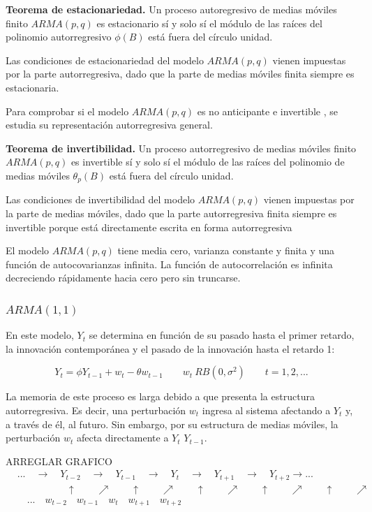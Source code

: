 \documentclass[a4paper,10pt]{article}
\begin{document}
\textbf{Teorema de estacionariedad.} Un proceso autoregresivo de medias móviles finito $ARMA(p,q)$ es estacionario sí y solo sí el módulo de las raíces del polinomio autorregresivo $\phi(B)$ está fuera del círculo unidad.

Las condiciones de estacionariedad del modelo $ARMA(p,q)$ vienen impuestas por la parte autorregresiva, dado que la parte de medias móviles finita siempre es estacionaria.

Para comprobar si el modelo $ARMA(p,q)$ es no anticipante e invertible , se estudia su representación autorregresiva general.

\textbf{Teorema de invertibilidad.} Un proceso autorregresivo de medias móviles finito $ARMA(p,q)$ es invertible sí y solo sí el módulo de las raíces del polinomio de medias móviles $\theta_p(B)$ está fuera del círculo unidad.

Las condiciones de invertibilidad del modelo $ARMA(p,q)$ vienen impuestas por la parte de medias móviles, dado que la parte autorregresiva finita siempre es invertible porque está directamente escrita en forma autorregresiva

El modelo $ARMA(p,q)$ tiene media cero, varianza constante y finita y una función de autocovarianzas infinita. La función de autocorrelación es infinita decreciendo rápidamente hacia cero pero sin truncarse.

\subsubsection{$ARMA(1,1)$}

En este modelo, $Y_t$ se determina en función de su pasado hasta el primer retardo, la innovación contemporánea y el pasado de la innovación hasta el retardo 1:

\begin{equation}
Y_t = \phi Y_{t-1} + w_t - \theta w_{t-1} \qquad w_t ~ RB (0,\sigma^2) \qquad t=1,2,...
\end{equation}


La memoria de este proceso es larga debido a que presenta la estructura autorregresiva. Es decir, una perturbación $w_t$ ingresa al sistema afectando a $Y_t$ y, a través de él, al futuro. Sin embargo, por su estructura de medias móviles, la perturbación $w_t$ afecta directamente a $Y_t$ $Y_{t-1}$.

ARREGLAR GRAFICO
\begin{equation*}
\begin{split}
& ... \quad \to \quad Y_{t-2} \quad \to \quad Y_{t-1} \quad \to \quad Y_{t} \quad \to \quad Y_{t+1} \quad \to \quad Y_{t+2} \to ... \\
& \quad \quad \quad \quad \quad \uparrow \quad \quad \nearrow \quad \quad \uparrow \quad \quad \nearrow \quad \quad \uparrow \quad \quad \nearrow \quad \quad \uparrow \quad \quad \nearrow \quad \quad \uparrow \quad \quad \nearrow \\
& \quad ...\quad w_{t-2} \quad w_{t-1} \quad w_{t} \quad w_{t+1} \quad w_{t+2}
\end{split}
\end{equation*}
\end{document}
